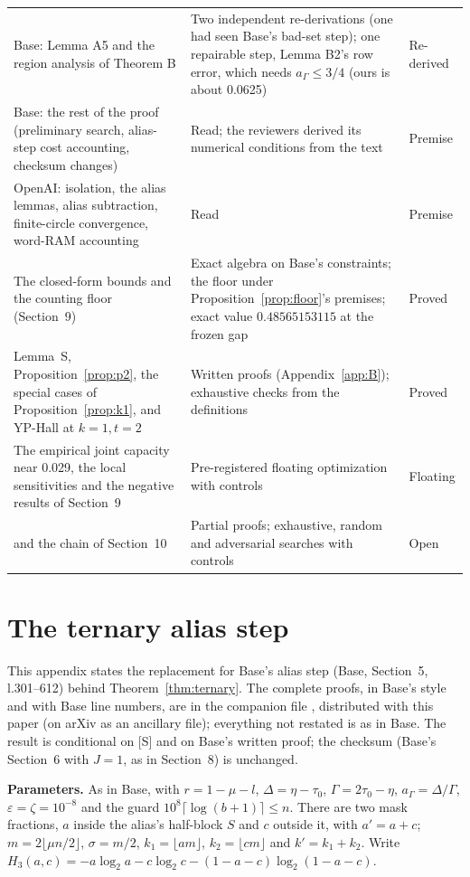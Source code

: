 \documentclass[11pt]{article}
\newcommand{\eps}{\varepsilon}
\theoremstyle{plain}
\begin{document}
{\begin{longtable}{@{}>{\raggedright\arraybackslash}p{4.2cm}>{\raggedright\arraybackslash}p{8.7cm}>{\raggedright\arraybackslash}p{2.6cm}@{}}
Base: Lemma A5 and the region analysis of Theorem B & Two independent re-derivations (one had seen Base's bad-set step); one repairable step, Lemma B2's row error, which needs $a_\Gamma \le 3/4$ (ours is about 0.0625) & Re-derived \\
Base: the rest of the proof (preliminary search, alias-step cost accounting, checksum changes) & Read; the reviewers derived its numerical conditions from the text & Premise \\
OpenAI: isolation, the alias lemmas, alias subtraction, finite-circle convergence, word-RAM accounting & Read & Premise \\
The closed-form bounds and the counting floor (Section~9) & Exact algebra on Base's constraints; the floor under Proposition~\ref{prop:floor}'s premises; exact value $0.48565153115$ at the frozen gap & Proved \\
Lemma~S, Proposition~\ref{prop:p2}, the special cases of Proposition~\ref{prop:k1}, and YP-Hall at $k=1,t=2$ & Written proofs (Appendix~\ref{app:B}); exhaustive checks from the definitions & Proved \\
The empirical joint capacity near 0.029, the local sensitivities and the negative results of Section~9 & Pre-registered floating optimization with controls & Floating \\
{[S]} and the chain of Section~10 & Partial proofs; exhaustive, random and adversarial searches with controls & Open \\
\end{longtable}
}

\appendix

\section{The ternary alias step}\label{app:T}

This appendix states the replacement for Base's alias step (Base, Section~5, l.301--612) behind Theorem~\ref{thm:ternary}. The complete proofs, in Base's style and with Base line numbers, are in the companion file , distributed with this paper (on arXiv as an ancillary file); everything not restated is as in Base. The result is conditional on [S] and on Base's written proof; the checksum (Base's Section~6 with $J = 1$, as in Section~8) is unchanged.

\textbf{Parameters.} As in Base, with $r = 1 - \mu - l$, $\Delta = \eta - \tau_0$, $\Gamma = 2\tau_0 - \eta$, $a_\Gamma = \Delta/\Gamma$, $\eps = \zeta = 10^{-8}$ and the guard $10^8\lceil\log(b+1)\rceil \le n$. There are two mask fractions, $a$ inside the alias's half-block $S$ and $c$ outside it, with $a' = a + c$; $m = 2\lfloor \mu n/2 \rfloor$, $\sigma = m/2$, $k_1 = \lfloor am \rfloor$, $k_2 = \lfloor cm \rfloor$ and $k' = k_1 + k_2$. Write $H_3(a,c) = -a\log_2 a - c\log_2 c - (1-a-c)\log_2(1-a-c)$.
\end{document}
